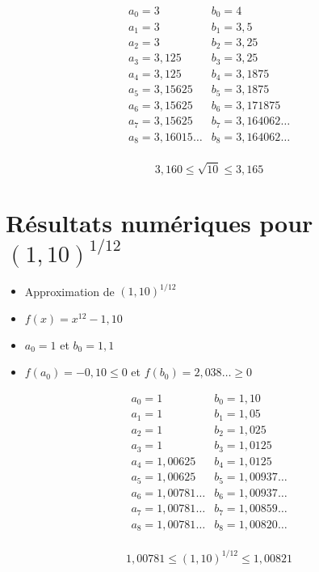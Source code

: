 \begin{frame}
$$
\begin{array}{ll}
  a_0 = 3      & b_0 = 4 \\
  a_1 = 3      & b_1 = 3,5 \\
  a_2 = 3      & b_2 = 3,25 \\
  a_3 = 3,125  & b_3 = 3,25 \\
  a_4 = 3,125  & b_4 = 3,1875 \\
  a_5 = 3,15625 & b_5 = 3,1875 \\
  a_6 = 3,15625 & b_6 = 3,171875 \\
  a_7 = 3,15625 & b_7 = 3,164062\ldots \\
  a_8 = 3,16015\ldots & b_8 = 3,164062\ldots \\
\end{array}
$$


$$3,160  \le \sqrt{10} \le 3,165$$

\end{frame}



\section{Résultats numériques pour $(1,10)^{1/12}$}

\begin{frame}
\begin{itemize}
  \item Approximation de $(1,10)^{1/12}$
  
  \item $f(x) = x^{12} - 1,10$
  
  \item $a_0=1$ et $b_0=1,1$
  
  \item $f(a_0)=-0,10 \le 0$ et $f(b_0)=2,038\ldots \ge 0$
 
\end{itemize}

$$
\begin{array}{ll}
  a_0 = 1             & b_0 = 1,10 \\
  a_1 = 1             & b_1 = 1,05 \\
  a_2 = 1             & b_2 = 1,025 \\
  a_3 = 1             & b_3 = 1,0125 \\
  a_4 = 1,00625       & b_4 = 1,0125 \\
  a_5 = 1,00625       & b_5 = 1,00937\ldots\\
  a_6 = 1,00781\ldots & b_6 = 1,00937\ldots \\
  a_7 = 1,00781\ldots & b_7 = 1,00859\ldots \\
  a_8 = 1,00781\ldots & b_8 = 1,00820\ldots \\
\end{array}
$$

$$ 1,00781 \le (1,10)^{1/12} \le 1,00821$$

\end{frame}



